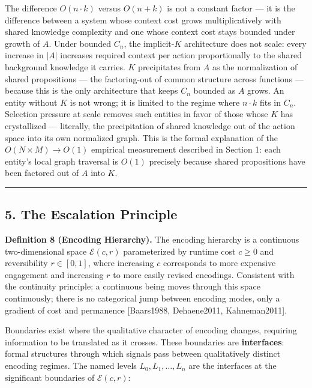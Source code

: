 \documentclass[
]{article}
\begin{document}
The difference \(O(n \cdot k)\) versus \(O(n + k)\) is not a constant
factor --- it is the difference between a system whose context cost
grows multiplicatively with shared knowledge complexity and one whose
context cost stays bounded under growth of \(A\). Under bounded \(C_n\),
the implicit-\(K\) architecture does not scale: every increase in
\(|A|\) increases required context per action proportionally to the
shared background knowledge it carries. \(K\) precipitates from \(A\) as
the normalization of shared propositions --- the factoring-out of common
structure across functions --- because this is the only architecture
that keeps \(C_n\) bounded as \(A\) grows. An entity without \(K\) is
not wrong; it is limited to the regime where \(n \cdot k\) fits in
\(C_n\). Selection pressure at scale removes such entities in favor of
those whose \(K\) has crystallized --- literally, the precipitation of
shared knowledge out of the action space into its own normalized graph.
This is the formal explanation of the \(O(N \times M) \to O(1)\)
empirical measurement described in Section 1: each entity's local graph
traversal is \(O(1)\) precisely because shared propositions have been
factored out of \(A\) into \(K\).

\begin{center}\rule{0.5\linewidth}{0.5pt}\end{center}

\subsection{5. The Escalation Principle}\label{the-escalation-principle}

\textbf{Definition 8 (Encoding Hierarchy).} The encoding hierarchy is a
continuous two-dimensional space \(\mathcal{E}(c, r)\) parameterized by
runtime cost \(c \geq 0\) and reversibility \(r \in [0, 1]\), where
increasing \(c\) corresponds to more expensive engagement and increasing
\(r\) to more easily revised encodings. Consistent with the continuity
principle: a continuous being moves through this space continuously;
there is no categorical jump between encoding modes, only a gradient of
cost and permanence {[}Baars1988, Dehaene2011, Kahneman2011{]}.

Boundaries exist where the qualitative character of encoding changes,
requiring information to be translated as it crosses. These boundaries
are \textbf{interfaces}: formal structures through which signals pass
between qualitatively distinct encoding regimes. The named levels
\(L_0, L_1, \ldots, L_n\) are the interfaces at the significant
boundaries of \(\mathcal{E}(c, r)\):
\end{document}
